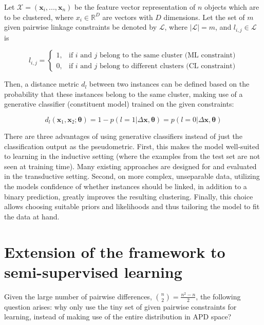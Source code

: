 \documentclass[12pt,PhD,twoside]{muthesis}
\begin{document}
Let $\mathcal{X}=(\boldsymbol x_i, ..., \boldsymbol x_n)$ be the feature vector representation of $n$ objects which are to be clustered, where $x_i \in \mathbb{R}^D$ are vectors with $D$ dimensions. Let the set of $m$ given pairwise linkage constraints be denoted by $\mathcal{L}$, where $ \lvert \mathcal{L} \lvert = m $, and $l_{i,j} \in \mathcal{L}$ is

\begin{equation}
l_{i,j}=
\begin{cases}
1, & \text{if $i$ and $j$ belong to the same cluster (ML constraint)} \\
0, & \text{if $i$ and $j$ belong to different clusters (CL constraint)}
\end{cases}
\end{equation}

Then, a distance metric $d_l$ between two instances can be defined based on the probability that these instances belong to the same cluster, making use of a generative classifier (constituent model) trained on the given constraints:

\begin{equation}
\label{eq:metric}
d_l(\boldsymbol x_1, \boldsymbol x_2; \boldsymbol{\theta}) = 1 - p(l=1|\Delta \boldsymbol x, \boldsymbol{\theta}) = p(l=0|\Delta \boldsymbol x, \boldsymbol{\theta})
\end{equation}

There are three advantages of using generative classifiers instead of just the classification output as the pseudometric. First, this makes the model well-suited to learning in the inductive setting (where the examples from the test set are not seen at training time). Many existing approaches are designed for and evaluated in the transductive setting. Second, on more complex, unseparable data, utilizing the models confidence of whether instances should be linked, in addition to a binary prediction, greatly improves the resulting clustering. Finally, this choice allows choosing suitable priors and likelihoods and thus tailoring the model to fit the data at hand.

\section*{Extension of the framework to semi-supervised learning}

Given the large number of pairwise differences, ${n \choose 2}=\frac{n^2-n}{2}$, the following question arises: why only use the tiny set of given pairwise constraints for learning, instead of making use of the entire distribution in APD space?
\end{document}
